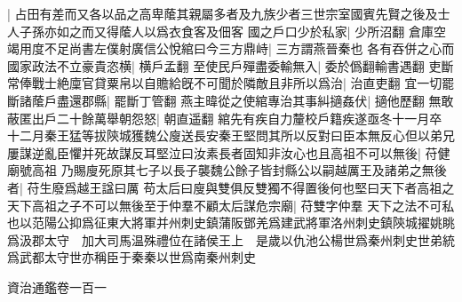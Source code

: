 |{
	占田有差而又各以品之高卑䕃其親屬多者及九族少者三世宗室國賓先賢之後及士人子孫亦如之而又得䕃人以爲衣食客及佃客}
國之戶口少於私家|{
	少所沼翻}
倉庫空竭用度不足尚書左僕射廣信公悅綰曰今三方鼎峙|{
	三方謂燕晉秦也}
各有吞併之心而國家政法不立豪貴恣横|{
	横戶孟翻}
至使民戶殫盡委輸無入|{
	委於僞翻輸書遇翻}
吏斷常俸戰士絶廩官貸粟帛以自贍給旣不可聞於隣敵且非所以爲治|{
	治直吏翻}
宜一切罷斷諸䕃戶盡還郡縣|{
	罷斷丁管翻}
燕主暐從之使綰專治其事糾擿姦伏|{
	擿他歷翻}
無敢蔽匿出戶二十餘萬舉朝怨怒|{
	朝直遥翻}
綰先有疾自力釐校戶籍疾遂亟冬十一月卒　十二月秦王猛等拔陝城獲魏公廋送長安秦王堅問其所以反對曰臣本無反心但以弟兄屢謀逆亂臣懼并死故謀反耳堅泣曰汝素長者固知非汝心也且高祖不可以無後|{
	苻健廟號高祖}
乃賜廋死原其七子以長子襲魏公餘子皆封縣公以嗣越厲王及諸弟之無後者|{
	苻生廢爲越王諡曰厲}
苟太后曰廋與雙俱反雙獨不得置後何也堅曰天下者高祖之天下高祖之子不可以無後至于仲羣不顧太后謀危宗廟|{
	苻雙字仲羣}
天下之法不可私也以范陽公抑爲征東大將軍并州刺史鎮蒲阪鄧羌爲建武將軍洛州刺史鎮陝城擢姚眺爲汲郡太守　加大司馬温殊禮位在諸侯王上　是歲以仇池公楊世爲秦州刺史世弟統爲武都太守世亦稱臣于秦秦以世爲南秦州刺史

資治通鑑卷一百一
